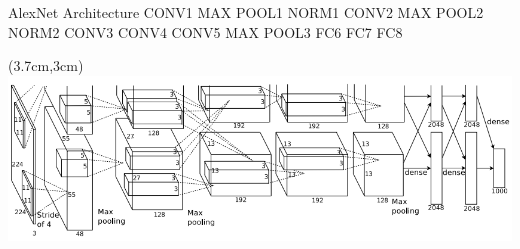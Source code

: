 \documentclass[serif, aspectratio=169]{beamer}
\begin{document}
\begin{frame}{AlexNet Architecture}
	\textcolor[rgb]{0.998, 0.007, 0.003}{CONV1} \newline
	\textcolor[rgb]{0.001, 0.001, 0.998}{MAX POOL1} \newline
	\textcolor[rgb]{0.219, 0.463, 0.114}{NORM1} \newline 
	\textcolor[rgb]{0.998, 0.007, 0.003}{CONV2} \newline
	\textcolor[rgb]{0.001, 0.001, 0.998}{MAX POOL2} \newline
	\textcolor[rgb]{0.219, 0.463, 0.114}{NORM2} \newline 
	\textcolor[rgb]{0.998, 0.007, 0.003}{CONV3} \newline
	\textcolor[rgb]{0.998, 0.007, 0.003}{CONV4} \newline
	\textcolor[rgb]{0.998, 0.007, 0.003}{CONV5} \newline
	\textcolor[rgb]{0.001, 0.001, 0.998}{MAX POOL3} \newline
	\textcolor[rgb]{0.902, 0.570, 0.218}{FC6} \newline
	\textcolor[rgb]{0.902, 0.570, 0.218}{FC7} \newline
	\textcolor[rgb]{0.902, 0.570, 0.218}{FC8}
	
	\begin{textblock*}{5cm}(3.7cm,3cm) %
		\includegraphics[keepaspectratio, scale=0.4]{pic/alexnet}
	\end{textblock*}
\end{frame}
\end{document}
